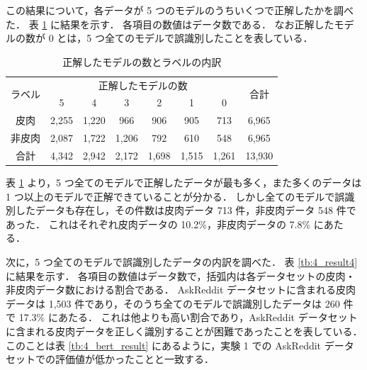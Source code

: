 \par
この結果について，各データが 5 つのモデルのうちいくつで正解したかを調べた．
表 \ref{tb:4_result3} に結果を示す．
各項目の数値はデータ数である．
なお正解したモデルの数が 0 とは，5 つ全てのモデルで誤識別したことを表している．

\begin{table}[tb]
  \caption{正解したモデルの数とラベルの内訳}
  \label{tb:4_result3}
  \centering
  \begin{tabular}{c c c c c c c c} \hline

\multirow{2}{*}{ラベル} & \multicolumn{6}{c}{正解したモデルの数} & \multirow{2}{*}{合計} \\ \cline{2-7}
 & 5 & 4 & 3 & 2 & 1 & 0 & \\ \hline
皮肉 & 2,255 & 1,220 & 966 & 906 & 905 & 713 & 6,965 \\
非皮肉 & 2,087 & 1,722 & 1,206 & 792 & 610 & 548 & 6,965 \\ \hline
合計 & 4,342 & 2,942 & 2,172 & 1,698 & 1,515 & 1,261 & 13,930 \\ \hline

  \end{tabular}
\end{table}

表 \ref{tb:4_result3} より，5 つ全てのモデルで正解したデータが最も多く，また多くのデータは 1 つ以上のモデルで正解できていることが分かる．
しかし全てのモデルで誤識別したデータも存在し，その件数は皮肉データ 713 件，非皮肉データ 548 件であった．
これはそれぞれ皮肉データの 10.2\%，非皮肉データの 7.8\% にあたる．


次に，5 つ全てのモデルで誤識別したデータの内訳を調べた．
表 \ref{tb:4_result4} に結果を示す．
各項目の数値はデータ数で，括弧内は各データセットの皮肉・非皮肉データ数における割合である．
AskReddit データセットに含まれる皮肉データは 1,503 件であり，そのうち全てのモデルで誤識別したデータは 260 件で 17.3\% にあたる．
これは他よりも高い割合であり，AskReddit データセットに含まれる皮肉データを正しく識別することが困難であったことを表している．
このことは表 \ref{tb:4_bert_result} にあるように，実験 1 での AskReddit データセットでの評価値が低かったことと一致する．


